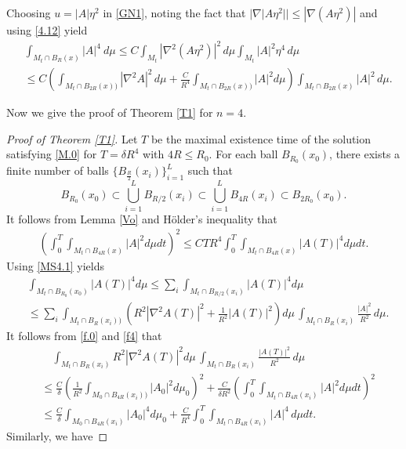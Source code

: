 \documentclass{amsart}
\theoremstyle{definition}
\numberwithin{equation}{section}
\begin{document}
Choosing $u=|A|\eta^2$ in \eqref{GN1}, noting the fact that $|\nabla |A\eta^2||\leq |\nabla (A \eta^2)|$  and  using \eqref{4.12} yield
\begin{align}\label{MS4.1}
 &  \int_{  M_t\cap B_{R}(x)}   |A|^{4}\  d\mu\leq C  \int_{M_t}  |\nabla^2 (A\eta^2 )|^2 \,d\mu   \int_{M_t}  | A|^2 \eta^4 \,d\mu  \\
 & \leq C \left ( \int_{  M_t\cap B_{2R}(x))}  |\nabla^2 A|^2 \,d\mu  +\frac C{R^4}\int_{  M_t\cap B_{2R}(x))} \left| A \right|^{2} d\mu
 \right )\int_{  M_t\cap B_{2R}(x)}  | A|^2  \,d\mu\nonumber.
\end{align}


Now we give  the proof of Theorem  \ref{T1} for $n=4$.
\begin{proof}[Proof of Theorem  \ref{T1}]
 Let $T$ be the maximal existence time of the solution  satisfying \eqref{M.0} for  $T=\delta R^4$ with $4R\leq R_0$.
 For each ball $B_{R_0}(x_0)$, there exists a finite number of balls $\{ B_{\frac R 2}(x_i)\}_{i=1}^L$ such that
$$B_{R_0}(x_0)\subset\bigcup_{i=1}^L B_{R/2}(x_i)\subset  \bigcup_{i=1}^L B_{4R}(x_i)\subset B_{2R_0}(x_0).$$
It follows from Lemma \ref{Vo} and  H\"older's inequality that
\begin{align}\label{MS4.2}
  \left ( \int_0^T \int_{  M_t\cap B_{4R}(x)} \left| A\right|^{2} d\mu dt \right )^2   \leq C TR^4  \int_0^T \int_{  M_t\cap B_{4R}(x)} \left|
  A (T)\right|^{4} d\mu dt.
\end{align}
Using \eqref{MS4.1}  yields
\begin{align}\label{MS4.3}
& \int_{  M_t\cap B_{R_0}(x_0)} |A (T)|^{4}d\mu\leq \sum_{i}  \int_{ M_t\cap B_{R/2}(x_i)} |A (T)|^{4}d\mu \\
  &\leq \sum_{i} \int_{  M_t\cap B_{R}(x_i) ) } (R^2|\nabla^2 A (T)|^2 + \frac 1{R^2} \left| A (T)
 \right|^{2}) d\mu\,  \int_{  M_t\cap B_{R}(x_i)  } \frac {|  A|^2}{R^2}  \,d\mu.\nonumber
\end{align}
It follows from \eqref{f.0} and   \eqref{f4} that
\begin{align}\label{MS4.3.1}
 &\quad \int_{  M_t\cap B_{R}(x_i) } R^2 |\nabla^2 A (T)|^2   d\mu\,  \int_{  M_t\cap B_{R}(x_i) }\frac  {|  A (T)|^2}{R^2}  \,d\mu\\
 &\leq\frac  C{\delta} \left (\frac 1 {R^2}\int_{  M_0\cap B_{4R}(x_i))}  \left| A_0 \right|^{2}  d\mu_{0}\right )^2 +   \frac C {\delta
 R^{2}} \left (\int_0^T \int_{ M_t\cap B_{4R}(x_i)} {\left| A\right|^{2}} d\mu d t\right )^2\nonumber \\
 &\leq   \frac  C{\delta}  \int_{  M_0\cap B_{4R}(x_i)}|A_0|^4 d\mu_{0}+\frac {C} {R^4} \int_0^T\int_{ M_t\cap B_{4R}(x_i)}|A|^4\,d\mu d t
  \nonumber.
\end{align}
Similarly, we have


\end{proof}
\end{document}
